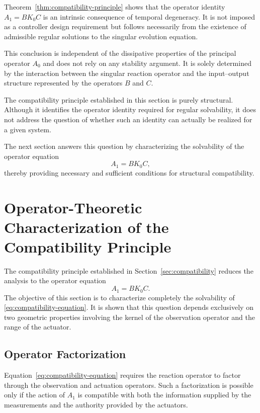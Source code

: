 \documentclass[pdflatex,sn-mathphys-num]{sn-jnl}
\theoremstyle{thmstyleone}%
\theoremstyle{thmstyletwo}%
\theoremstyle{thmstylethree}%
\begin{document}
Theorem~\ref{thm:compatibility-principle} shows that the operator identity \( A_{1}=BK_{0}C \) is an intrinsic consequence of temporal degeneracy. It is not imposed as a controller design requirement but follows necessarily from the existence of admissible regular solutions to the singular evolution equation.

This conclusion is independent of the dissipative properties of the principal operator \(A_{0}\) and does not rely on any stability argument. It is solely determined by the interaction between the singular reaction operator and the input--output structure represented by the operators \(B\) and \(C\).

The compatibility principle established in this section is purely structural. Although it identifies the operator identity required for regular solvability, it does not address the question of whether such an identity can actually be realized for a given system.

The next section answers this question by characterizing the solvability of the operator equation
\[
A_{1}=BK_{0}C,
\]
thereby providing necessary and sufficient conditions for structural compatibility.

\section{Operator-Theoretic Characterization of the Compatibility Principle}
\label{sec:factorization}

The compatibility principle established in
Section~\ref{sec:compatibility} reduces the analysis to the operator equation
\begin{equation}
A_{1}=BK_{0}C.
\label{eq:compatibility-equation}
\end{equation}
The objective of this section is to characterize completely the solvability of \eqref{eq:compatibility-equation}. It is shown that this question depends exclusively on two geometric properties involving the kernel of the observation operator and the range of the actuator.

\subsection{Operator Factorization}
\label{subsec:factorization-theorem}

Equation~\eqref{eq:compatibility-equation}
requires the reaction operator to factor through the observation and actuation operators. Such a factorization is possible only if the action of \(A_{1}\) is compatible with both the information supplied by the measurements and the authority provided by the actuators.
\end{document}
